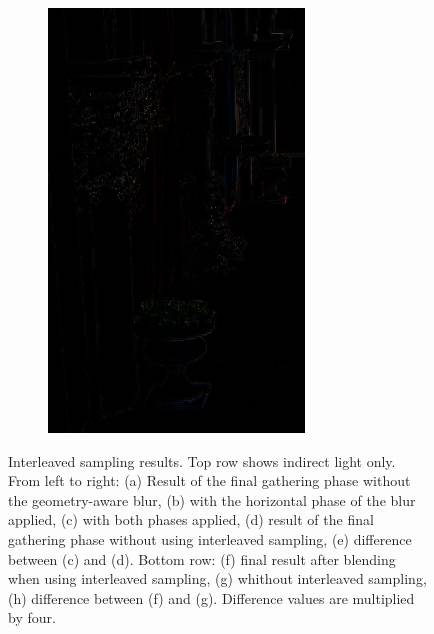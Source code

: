 \begin{figure}[htb]
\begin{subfigure}[b]{0.32\textwidth}
        \includegraphics[width=.95\textwidth]{screenshots/interleaved_difference_shaded}
        \caption{}
        \label{fig:results:interleaved_difference_shaded}
    \end{subfigure}

      \caption{Interleaved sampling results. Top row shows indirect light only. From left to right: (a) Result of the final gathering phase without the geometry-aware blur, (b) with the horizontal phase of the blur applied, (c) with both phases applied, (d) result of the final gathering phase without using interleaved sampling, (e) difference between (c) and (d). Bottom row: (f) final result after blending when using interleaved sampling, (g) whithout interleaved sampling, (h) difference between (f) and (g). Difference values are multiplied by four.}
      \label{fig:results:interleaved_quality}
\end{figure}


